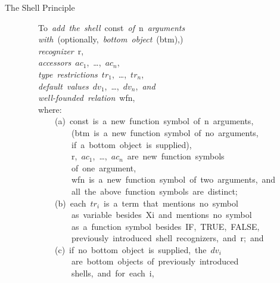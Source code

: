 \documentclass[11pt]{book}
\newenvironment{pubasis}{\begin{flushleft}\ttfamily\small}{\normalsize\rmfamily\end{flushleft}}
\newcommand{\pubinlineunderline}[1]{\emph{#1}}
\begin{document}
\par\pagebreak[0]\hrulefill\nopagebreak\par
\begin{center}
The Shell Principle
\end{center}
\begin{pubasis}
~~~~~~~~To~\pubinlineunderline{add~the~shell}~const~\pubinlineunderline{of}~n~\pubinlineunderline{arguments}\\
~~~~~~~~\pubinlineunderline{with}~(optionally,~\pubinlineunderline{bottom~object}~(btm),)\\
~~~~~~~~\pubinlineunderline{recognizer}~r,\\
~~~~~~~~\pubinlineunderline{accessors}~$ac_{1}$,~\ldots{},~$ac_{n}$,\\
~~~~~~~~\pubinlineunderline{type~restrictions}~$tr_{1}$,~\ldots{},~$tr_{n}$,\\
~~~~~~~~\pubinlineunderline{default~values}~$dv_{1}$,~\ldots{},~$dv_{n}$,~\pubinlineunderline{and}\\
~~~~~~~~\pubinlineunderline{well-founded~relation}~wfn,\\
~~~~~~~~where:\\

~~~~~~~~~~~~(a)~const~is~a~new~function~symbol~of~n~arguments,\\
~~~~~~~~~~~~~~~~(btm~is~a~new~function~symbol~of~no~arguments,\\
~~~~~~~~~~~~~~~~if~a~bottom~object~is~supplied),\\
~~~~~~~~~~~~~~~~r,~$ac_{1}$,~\ldots{},~$ac_{n}$~are~new~function~symbols\\
~~~~~~~~~~~~~~~~of~one~argument,\\
~~~~~~~~~~~~~~~~wfn~is~a~new~function~symbol~of~two~arguments,~and\\
~~~~~~~~~~~~~~~~all~the~above~function~symbols~are~distinct;\\

~~~~~~~~~~~~(b)~each~$tr_{i}$~is~a~term~that~mentions~no~symbol\\
~~~~~~~~~~~~~~~~as~variable~besides~Xi~and~mentions~no~symbol\\
~~~~~~~~~~~~~~~~as~a~function~symbol~besides~IF,~TRUE,~FALSE,~\\
~~~~~~~~~~~~~~~~previously~introduced~shell~recognizers,~and~r;~and\\

~~~~~~~~~~~~(c)~if~no~bottom~object~is~supplied,~the~$dv_{i}$\\
~~~~~~~~~~~~~~~~are~bottom~objects~of~previously~introduced\\
~~~~~~~~~~~~~~~~shells,~and~for~each~i,\\


\end{pubasis}
\end{document}
